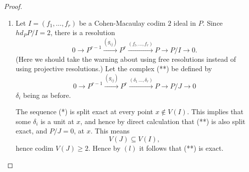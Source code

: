 {\begin{proof}
\begin{enumerate}[(1)]
But\pageoriginale depth $P/J+hd_PP/J=n$. This implies that $\dim
P/J=\text{depth}\break P/J=(n-2)$ and $hd_PP/J=2$, which shows that $X$ is
Cohen-Macaulay of codim $2$ in $\mathbb{A}^{n}$. 

Since $V(J)\neq\mathbb{A}^{n}$, the $\delta_{i}$'s are not {\em all}
identically $0$, hence $0\to P^{r-1}\to P^{r}$ is {\em exact}. Further
we note that any $x_o\not\in V(J), (g_{ij}(x_o))$ is of rank $(r-1)$ and
in fact one of $(\delta_1,\ldots,\delta_r)$ is nonzero at $x_o$ and
hence a {\em unit} locally at $x_o$. This implies that $P^{r-1}\to
P^{r}\to P$ {\em split exact} locally at $x_o$ (i.e., if $B$ is the
local ring of $\mathbb{A}^{n}$ at $x_o$, then tensoring by $B$ gives a
split exact sequence). Because of our hypothesis that codim $V(J)\ge
2$, if $x$ is a point of $\mathbb{A}^{n}$ represented by a prime ideal
of height one and $B$ its local ring. then tensoring by $B$ makes
$P^{r-1}\to P^{r}\to P$ exact (i.e., the sequence is exact in codim
1). Let $K=\Ker(P^{r}\to P)$. We have $K\subset P^{r}$ such that
$0\to P^{r-1}\to K$, and $0\to K \to P^{r}\to P$ exact. Tensoring by
$B$ as above, it follows that $P^{r-1}\otimes B\to K\otimes B$ is an
isomorphism (tensoring by $B$ is a localization); i.e., the inclusion
$P^{r-1}\subset K$ is in fact an isomorphism in codim $1$. Since
$P^{r-1}$ is free sections of $P^{r-1}$ defined in codimension $1$
exrtend to global sections. Moreover, $K$ is torsion-free. Therefore,
the fact that $P^{r-1}\subset K$ is an isomorphism in codimension $1$
implies that it is an {\em isomorphism everywhere}. Therefore,
$P^{r-1}\to P^{r}\to P$ is exact, and this completes the proof of
(1). 

\item Let $I=(f_1,\ldots,f_r)$ be a Cohen-Macaulay codim $2$ ideal in
$P$. Since $hd_PP/I=2$, there is a resolution 
\begin{equation*}
0\to
P^{r-1}\xrightarrow{(g_{ij})}P^{r}\xrightarrow{(f_l,\ldots,f_r)}P\to
P/I \to 0.\tag{*}
\end{equation*}
(Here we should take the warning about using free resolutions instead
of using projective resolutions.) Let the complex (**) be defined by 
\begin{equation*}
0\to P^{r-1}\xrightarrow{(g_{ij})}P^{r}\xrightarrow{(\delta_1\,\ldots,\delta_r)}P\to P/J\to 0\tag{**}
\end{equation*}\pageoriginale
$\delta_i$ being as before.

The sequence (*) is split exact at every point $x\notin V(I)$. This
implies that some $\delta_i$ is a unit at $x$, and hence by direct
calculation that (**) is also split exact, and $P/J=0$, at $x$. This
means 
$$
V(J)\subseteq V(I),
$$
hence codim $V(J)\ge 2$. Hence by $(l)$ it follows that (**) is exact.


\end{enumerate}
\end{proof}}
